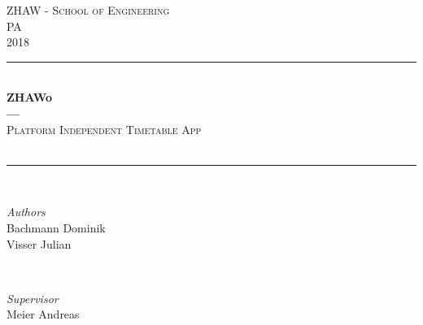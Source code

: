 
\begin{titlepage} %
	\newcommand{\HRule}{\rule{\linewidth}{0.5mm}} %

	\center %


	\textsc{\LARGE ZHAW - School of Engineering}\\[1.5cm] %

	\textsc{\Large PA}\\[0.5cm] %

	\textsc{\large 2018}\\[0.5cm] %


	\HRule\\[0.4cm]

	{\huge\bfseries ZHAWo \\
									--- \\}
	\textsc{\large Platform Independent Timetable App}\\[0.5cm]
									\\ %

	\HRule\\[1.5cm]


	\begin{minipage}{0.4\textwidth}
		\begin{flushleft}
			\large
			\textit{Authors}\\
			Bachmann Dominik \\
			Visser Julian %
		\end{flushleft}
	\end{minipage}
	~
	\begin{minipage}{0.4\textwidth}
		\begin{flushright}
			\large
			\textit{Supervisor}\\
			Meier Andreas %
		\end{flushright}
	\end{minipage}




\end{titlepage}
